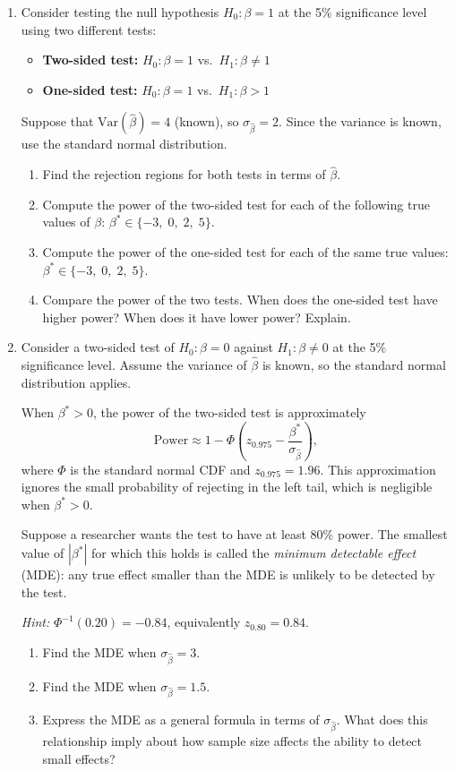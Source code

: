 \documentclass[12pt]{article}
\begin{document}
\begin{enumerate}
\item Consider testing the null hypothesis $H_0\colon \beta = 1$ at the 5\% significance level using two different tests:
\begin{itemize}
\item \textbf{Two-sided test:} $H_0\colon \beta = 1$ vs.\ $H_1\colon \beta \ne 1$
\item \textbf{One-sided test:} $H_0\colon \beta = 1$ vs.\ $H_1\colon \beta > 1$
\end{itemize}
Suppose that $\text{Var}(\hat{\beta}) = 4$ (known), so $\sigma_{\hat{\beta}} = 2$. Since the variance is known, use the standard normal distribution.
\begin{enumerate}
\item Find the rejection regions for both tests in terms of $\hat{\beta}$.
\item Compute the power of the two-sided test for each of the following true values of $\beta$: $\beta^* \in \{-3,\; 0,\; 2,\; 5\}$.
\item Compute the power of the one-sided test for each of the same true values: $\beta^* \in \{-3,\; 0,\; 2,\; 5\}$.
\item Compare the power of the two tests. When does the one-sided test have higher power? When does it have lower power? Explain.
\end{enumerate}

\item Consider a two-sided test of $H_0\colon \beta = 0$ against
$H_1\colon \beta \ne 0$ at the 5\% significance level. Assume the
variance of $\hat{\beta}$ is known, so the standard normal
distribution applies.

When $\beta^* > 0$, the power of the two-sided test is approximately
$$
\text{Power} \approx 1 - \Phi\!\left(z_{0.975} -
\frac{\beta^*}{\sigma_{\hat{\beta}}}\right),
$$
where $\Phi$ is the standard normal CDF and $z_{0.975} = 1.96$.
This approximation ignores the small probability of rejecting
in the left tail, which is negligible when $\beta^*>0$.

Suppose a researcher wants the test to have at least 80\% power.
The smallest value of $|\beta^*|$ for which this holds is called
the \emph{minimum detectable effect} (MDE): any true effect
smaller than the MDE is unlikely to be detected by the test.

\medskip
\textit{Hint:} $\Phi^{-1}(0.20) = -0.84$, equivalently $z_{0.80} = 0.84$.

\begin{enumerate}
\item Find the MDE when $\sigma_{\hat{\beta}} = 3$.
\item Find the MDE when $\sigma_{\hat{\beta}} = 1.5$.
\item Express the MDE as a general formula in terms of
$\sigma_{\hat{\beta}}$. What does this relationship imply about
how sample size affects the ability to detect small effects?
\end{enumerate}


\end{enumerate}
\end{document}
